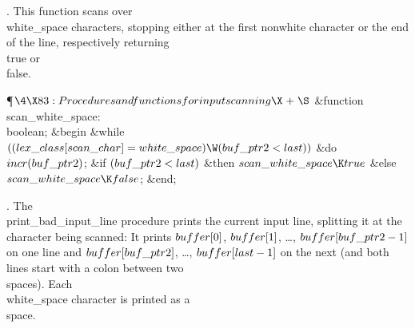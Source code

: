 .
This function scans over \\{white\_space} characters, stopping either at
the first nonwhite character or the end of the line, respectively
returning \\{true} or \\{false}.

\Y\P$\4\X83:Procedures and functions for input scanning\X\mathrel{+}\S$\6
\4\&{function}\1\  \\{scan\_white\_space}: \\{boolean};\2\6
\&{begin} \6
\&{while} $((\\{lex\_class}[\\{scan\_char}]=\\{white\_space})\W(\\{buf\_ptr2}<%
\\{last}))$ \1\&{do}\5
$\\{incr}(\\{buf\_ptr2})$;\2\6
\&{if} $(\\{buf\_ptr2}<\\{last})$ \1\&{then}\5
$\\{scan\_white\_space}\K\\{true}$\6
\4\&{else} $\\{scan\_white\_space}\K\\{false}$;\2\6
\&{end};\par
\fi

.
The \\{print\_bad\_input\_line} procedure prints the current input line,
splitting it at the character being scanned: It prints $\\{buffer}[0]$,
$\\{buffer}[1]$, \dots, $\\{buffer}[\\{buf\_ptr2}-1]$ on one line and
$\\{buffer}[\\{buf\_ptr2}]$, \dots, $\\{buffer}[\\{last}-1]$ on the next (and
both
lines start with a colon between two \\{space}s).  Each \\{white\_space}
character is printed as a \\{space}.


